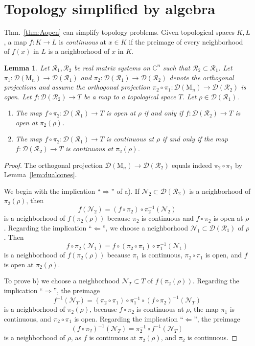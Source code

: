 \documentclass[a4paper,11pt,reqno]{amsart}
\newcommand{\C}{\mathbb{C}}
\newcommand{\M}{\mathrm{M}}
\newcommand{\cD}{\mathcal{D}}
\newcommand{\cN}{\mathcal{N}}
\newcommand{\cR}{\mathcal{R}}
\newtheorem{lem}[thm]{Lemma}
\theoremstyle{definition}
\theoremstyle{remark}
\numberwithin{equation}{section}
\begin{document}
\section{Topology simplified by algebra}
\label{sec:simpler-subalgebras}
%
Thm.~\ref{thm:Aopen} can simplify topology problems. Given topological spaces 
$K,L$, a map $f:K\to L$ is \emph{continuous} \cite{Kelley1975} at $x\in K$ if 
the preimage of every neighborhood of $f(x)$ in $L$ is a neighborhood of $x$ 
in $K$.
\par
%
\begin{lem}\label{lem:simplify}
Let $\cR_1,\cR_2$ be real matrix systems on $\C^n$ such that
\mbox{$\cR_2\subset\cR_1$}. Let $\pi_1:\cD(\M_n)\to\cD(\cR_1)$ and 
$\pi_2:\cD(\cR_1)\to\cD(\cR_2)$ denote the orthogonal projections and assume the 
orthogonal projection $\pi_2\circ\pi_1:\cD(\M_n)\to\cD(\cR_2)$ is open. Let 
$f:\cD(\cR_2)\to T$ be a map to a topological space $T$. Let $\rho\in\cD(\cR_1)$.
\begin{enumerate}
\item[a)] The map $f\circ\pi_2:\cD(\cR_1)\to T$ is open at $\rho$ if and only if
$f:\cD(\cR_2)\to T$ is open at $\pi_2(\rho)$.
\item[b)] The map $f\circ\pi_2:\cD(\cR_1)\to T$ is continuous at $\rho$ if and 
only if the map $f:\cD(\cR_2)\to T$ is continuous at $\pi_2(\rho)$.
\end{enumerate}
\end{lem}
%
\begin{proof}
The orthogonal projection $\cD(\M_n)\to\cD(\cR_2)$ equals indeed 
$\pi_2\circ\pi_1$ by Lemma~\ref{lem:dualcones}.
\par
%
We begin with the implication ``$\Rightarrow$'' of a). If $\cN_2\subset\cD(\cR_2)$ 
is a neighborhood of $\pi_2(\rho)$, then 
\[\textstyle
f(\cN_2)=(f\circ\pi_2)\circ\pi_2^{-1}(\cN_2)
\]
is a neighborhood of $f(\pi_2(\rho))$ because $\pi_2$ is continuous and 
$f\circ\pi_2$ is open at $\rho$. Regarding the implication ``$\Leftarrow$'', 
we choose a neighborhood $\cN_1\subset\cD(\cR_1)$ of $\rho$. Then
\[\textstyle
f\circ\pi_2(\cN_1)=f\circ(\pi_2\circ\pi_1)\circ\pi_1^{-1}(\cN_1)
\]
is a neighborhood of $f(\pi_2(\rho))$ because $\pi_1$ is continuous, 
$\pi_2\circ\pi_1$ is open, and $f$ is open at $\pi_2(\rho)$.
\par
%
To prove  b) we choose a neighborhood $\cN_T\subset T$ of $f(\pi_2(\rho))$. 
Regarding the implication ``$\Rightarrow$'', the preimage 
\[\textstyle
f^{-1}(\cN_T)=(\pi_2\circ\pi_1)\circ\pi_1^{-1}\circ(f\circ\pi_2)^{-1}(\cN_T)
\]
is a neighborhood of $\pi_2(\rho)$, because $f\circ\pi_2$ is continuous 
at $\rho$, the map $\pi_1$ is continuous, and $\pi_2\circ\pi_1$ is open.
Regarding the implication ``$\Leftarrow$'', the preimage
\[\textstyle
(f\circ\pi_2)^{-1}(\cN_T)=\pi_2^{-1}\circ f^{-1}(\cN_T)
\]
is a neighborhood of $\rho$, as $f$ is continuous at $\pi_2(\rho)$, 
and $\pi_2$ is continuous.
\end{proof}
\end{document}
